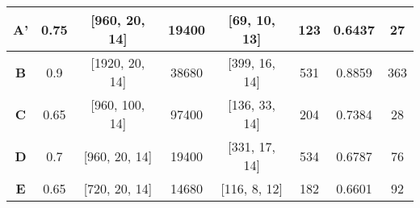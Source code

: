\begin{table}[H]
{\begin{tabular}{|c|c|c|c|c|c|c|c|}
\textbf{A'} & 0.75                                                                  & {[}960, 20, 14{]}                                                   & 19400                                                              & {[}69, 10, 13{]}                                                  & 123                                                               & 0.6437                                                                     & 27                                                              \\ \hline
\textbf{B} & 0.9                                                                  & {[}1920, 20, 14{]}                                                  & 38680                                                              & {[}399, 16, 14{]}                                                  & 531                                                               & 0.8859                                                                     & 363                                                              \\ \hline
\textbf{C} & 0.65                                                                 & {[}960, 100, 14{]}                                                  & 97400                                                              & {[}136, 33, 14{]}                                                  & 204                                                               & 0.7384                                                                     & 28                                                               \\ \hline
\textbf{D} & 0.7                                                                  & {[}960, 20, 14{]}                                                   & 19400                                                              & {[}331, 17, 14{]}                                                  & 534                                                               & 0.6787                                                                     & 76                                                               \\ \hline
\textbf{E} & 0.65                                                                 & {[}720, 20, 14{]}                                                   & 14680                                                              & {[}116, 8, 12{]}                                                   & 182                                                               & 0.6601                                                                     & 92                                                               \\ \hline

\end{tabular}}
\end{table}
